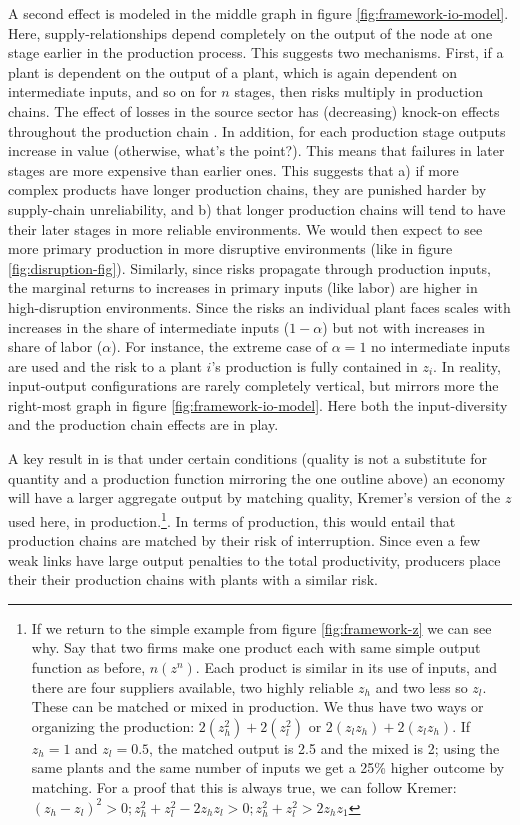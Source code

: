 \documentclass[11pt]{article}
\begin{document}
A second effect is modeled in the middle graph in figure \ref{fig:framework-io-model}. Here, supply-relationships depend completely on the output of the node at one stage earlier in the production process. This suggests two mechanisms. First, if a plant is dependent on the output of a plant, which is again dependent on intermediate inputs, and so on for \(n\) stages, then risks multiply in production chains. The effect of losses in the source sector has (decreasing) knock-on effects throughout the production chain \citep{carvalho_micro_2014}. In addition, for each production stage outputs increase in value (otherwise, what's the point?). This means that failures in later stages are more expensive than earlier ones. This suggests that a) if more complex products have longer production chains, they are punished harder by supply-chain unreliability, and b) that longer production chains will tend to have their later stages in more reliable environments. We would then expect to see more primary production in more disruptive environments (like in figure \ref{fig:disruption-fig}). Similarly, since risks propagate through production inputs, the marginal returns to increases in primary inputs (like labor) are higher in high-disruption environments. Since the risks an individual plant faces scales with increases in the share of intermediate inputs (\(1 - \alpha\)) but not with increases in share of labor (\(\alpha\)). For instance, the extreme case of \(\alpha = 1\) no intermediate inputs are used and the risk to a plant \(i\)'s production is fully contained in \(z_i\). In reality, input-output configurations are rarely completely vertical, but mirrors more the right-most graph in figure \ref{fig:framework-io-model}. Here both the input-diversity and the production chain effects are in play.

A key result in \cite{kremer_o-ring_1993} is that under certain conditions (quality is not a substitute for quantity and a production function mirroring the one outline above) an economy will have a larger aggregate output by matching quality, Kremer's version of the \(z\) used here, in production.\footnote{If we return to the simple example from figure
  \ref{fig:framework-z} we can see why. Say that two firms make one product each
  with same simple output function as before, \(n(z^n)\). Each product is
  similar in its use of inputs, and there are four suppliers available, two
  highly reliable \(z_{h}\) and two less so \(z_{l}\). These can be matched or mixed in production. We thus have two ways or organizing the production: \(2(z_h^2) + 2(z_l^2)\) or \(2(z_l z_h) + 2(z_l z_h)\). If \(z_h = 1\) and \(z_l = 0.5\), the matched output is 2.5 and the mixed is 2; using the same plants and the same number of inputs we get a 25\% higher outcome by matching. For a proof that this is always true, we can follow Kremer: \((z_h - z_l)^2 > 0; z_h^2 + z_l^2 - 2z_h z_l > 0; z_h^2 + z_l^2 > 2z_h z_1 \)}. In terms of production, this would entail that production chains are matched by their risk of interruption. Since even a few weak links have large output penalties to the total productivity, producers place their their production chains with plants with a similar risk.
\end{document}

